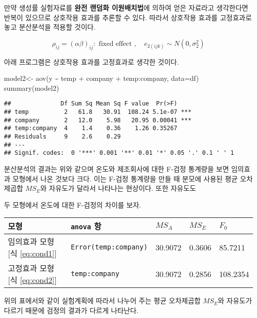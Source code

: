 \documentclass[
]{book}
\newenvironment{Shaded}{\begin{snugshade}}{\end{snugshade}}
\newcommand{\AttributeTok}[1]{\textcolor[rgb]{0.77,0.63,0.00}{#1}}
\newcommand{\FunctionTok}[1]{\textcolor[rgb]{0.00,0.00,0.00}{#1}}
\newcommand{\NormalTok}[1]{#1}
\newcommand{\OtherTok}[1]{\textcolor[rgb]{0.56,0.35,0.01}{#1}}
\newcommand{\SpecialCharTok}[1]{\textcolor[rgb]{0.00,0.00,0.00}{#1}}
\begin{document}
만약 생성률 실험자료를 \textbf{완전 랜덤화 이원배치법}에 의하여 얻은 자료라고 생각한다면 반복이 있으므로
상호작용 효과를 추론할 수 있다. 따라서 상호작용 효과를 고정효과로 놓고 분산분석을 적용할 것이다.

\begin{equation}
\rho_{ij}  = (\alpha \beta)_{ij} : \text{ fixed effect }, \quad e_{2(ijk)} \sim N(0, \sigma_2^2) 
\label{eq:cond2}
\end{equation}

아래 프로그램은 상호작용 효과를 고정효과로 생각한 것이다.

\begin{Shaded}
\begin{Highlighting}[]
\NormalTok{model2}\OtherTok{\textless{}{-}} \FunctionTok{aov}\NormalTok{(y }\SpecialCharTok{\textasciitilde{}}\NormalTok{ temp }\SpecialCharTok{+}\NormalTok{ company }\SpecialCharTok{+}\NormalTok{ temp}\SpecialCharTok{:}\NormalTok{company, }\AttributeTok{data=}\NormalTok{df)}
\FunctionTok{summary}\NormalTok{(model2)}
\end{Highlighting}
\end{Shaded}

\begin{verbatim}
##              Df Sum Sq Mean Sq F value  Pr(>F)    
## temp          2   61.8   30.91  108.24 5.1e-07 ***
## company       2   12.0    5.98   20.95 0.00041 ***
## temp:company  4    1.4    0.36    1.26 0.35267    
## Residuals     9    2.6    0.29                    
## ---
## Signif. codes:  0 '***' 0.001 '**' 0.01 '*' 0.05 '.' 0.1 ' ' 1
\end{verbatim}

분산분석의 결과는 위와 같으며 온도와 제조회사에 대한 F-검정 통계량을 보면 임의효과 모형에서 나온
것보다 크다. 이는 F-검정 통계량을 만들 때 분모에 사용된 평균 오차제곱합 \(MS_E\)와 자유도가 달라서 나타나는 현상이다. 또한 자유도도

두 모형에서 온도에 대한 F-검정의 차이를 보자.

\begin{longtable}[]{@{}lllll@{}}
\toprule
모형 & \texttt{anova} 항 & \(MS_A\) & \(MS_E\) & \(F_0\)\tabularnewline
\midrule
\endhead
임의효과 모형 {[}식 \eqref{eq:cond1}{]} & \texttt{Error(temp:company)} & 30.9072 & 0.3606 & 85.7211\tabularnewline
고정효과 모형 {[}식 \eqref{eq:cond2}{]} & \texttt{temp:company} & 30.9072 & 0.2856 & 108.2354\tabularnewline
\bottomrule
\end{longtable}

위의 표에서와 같이 실험계획에 따라서 나누어 주는 평균 오차제곱합 \(MS_E\)와 자유도가 다르기 때문에 검정의 결과가 다르게 나타난다.
\end{document}
